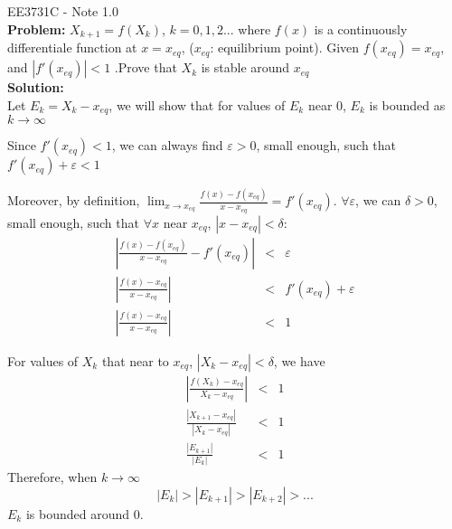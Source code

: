 \documentclass[11pt]{article}
\begin{document}
EE3731C - Note 1.0 \\

\textbf{Problem:} $X_{k+1} = f(X_k)$, $k = 0, 1, 2...$ where $f(x)$ is a continuously differentiale function at $x = x_{eq}$, ($x_{eq}$: equilibrium point). Given $f(x_{eq})=x_{eq}$, and $|f'(x_{eq})|<1$ .Prove that $X_k$ is stable around $x_{eq}$\\

\textbf{Solution:}\\
Let $E_k = X_k - x_{eq}$, we will show that for values of $E_k$ near 0, $E_k$ is bounded as $k \rightarrow \infty$

Since $f'(x_{eq})<1$, we can always find $\varepsilon > 0$, small enough, such that $f'(x_{eq})+\varepsilon < 1$

Moreover, by definition, $\lim _{x \rightarrow x_{eq}} \frac{f(x)-f(x_{eq})}{x-x_{eq}} = f'(x_{eq})$. $\forall \varepsilon$, we can $\delta > 0$, small enough, such that $\forall x$ near $x_{eq}$, $|x-x_{eq}|<\delta$:
\begin{eqnarray*}
	\left| \frac{f(x)-f(x_{eq})}{x-x_{eq}} - f'(x_{eq}) \right| &<& \varepsilon \\
	\left| \frac{f(x)-x_{eq}}{x-x_{eq}}\right| &<& f'(x_{eq}) + \varepsilon  \\
	\left| \frac{f(x)-x_{eq}}{x-x_{eq}}\right| &<& 1
\end{eqnarray*}

For values of $X_k$ that near to $x_{eq}$, $|X_k-x_{eq}| < \delta$, we have
\begin{eqnarray*}
	\left| \frac{f(X_k)-x_{eq}}{X_k-x_{eq}} \right| &<& 1 \\	
	\frac{|X_{k+1}-x_{eq}|}{|X_k-x_{eq}|} &<& 1 \\
	\frac{|E_{k+1}|}{|E_{k}|} &<& 1
\end{eqnarray*}
Therefore, when $k \rightarrow \infty$
$$ |E_{k}| > |E_{k+1}| > |E_{k+2}| > ...$$
$E_k$ is bounded around 0.
\end{document}
